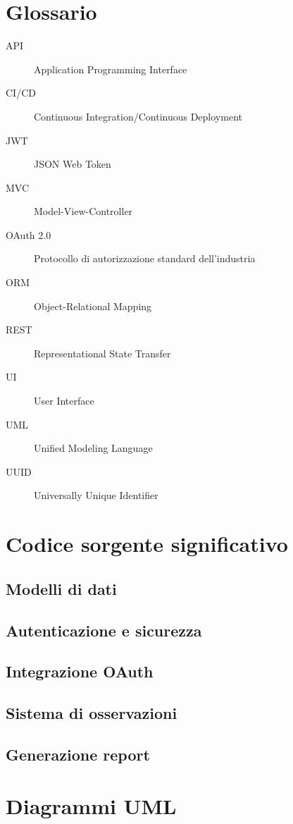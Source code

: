 \documentclass[12pt,a4paper,oneside]{report}
\begin{document}
\chapter{Glossario}
\begin{description}
    \item[API] Application Programming Interface
    \item[CI/CD] Continuous Integration/Continuous Deployment
    \item[JWT] JSON Web Token
    \item[MVC] Model-View-Controller
    \item[OAuth 2.0] Protocollo di autorizzazione standard dell'industria
    \item[ORM] Object-Relational Mapping
    \item[REST] Representational State Transfer
    \item[UI] User Interface
    \item[UML] Unified Modeling Language
    \item[UUID] Universally Unique Identifier
\end{description}

\chapter{Codice sorgente significativo}
\section{Modelli di dati}
\section{Autenticazione e sicurezza}
\section{Integrazione OAuth}
\section{Sistema di osservazioni}
\section{Generazione report}

\chapter{Diagrammi UML}
\end{document}
